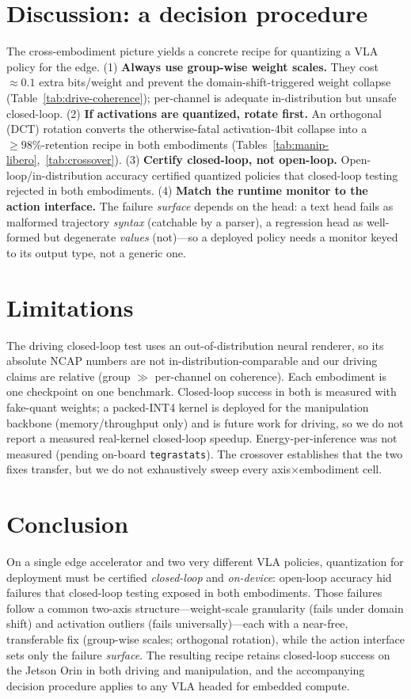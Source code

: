 \documentclass[conference]{IEEEtran}
\begin{document}
\section{Discussion: a decision procedure}
The cross-embodiment picture yields a concrete recipe for quantizing a VLA policy for the edge.
(1) \textbf{Always use group-wise weight scales.} They cost $\approx0.1$ extra bits/weight and
prevent the domain-shift-triggered weight collapse (Table~\ref{tab:drive-coherence}); per-channel is
adequate in-distribution but unsafe closed-loop. (2) \textbf{If activations are quantized, rotate
first.} An orthogonal (DCT) rotation converts the otherwise-fatal activation-4bit collapse into a
$\ge98\%$-retention recipe in both embodiments (Tables~\ref{tab:manip-libero},~\ref{tab:crossover}).
(3) \textbf{Certify closed-loop, not open-loop.} Open-loop/in-distribution accuracy certified
quantized policies that closed-loop testing rejected in both embodiments. (4) \textbf{Match the
runtime monitor to the action interface.} The failure \emph{surface} depends on the head: a text head
fails as malformed trajectory \emph{syntax} (catchable by a parser), a regression head as
well-formed but degenerate \emph{values} (not)---so a deployed policy needs a monitor keyed to its
output type, not a generic one.

\section{Limitations}
The driving closed-loop test uses an out-of-distribution neural renderer, so its absolute NCAP numbers
are not in-distribution-comparable and our driving claims are relative (group $\gg$ per-channel on
coherence). Each embodiment is one checkpoint on one benchmark. Closed-loop success in both is measured
with fake-quant weights; a packed-INT4 kernel is deployed for the manipulation backbone
(memory/throughput only) and is future work for driving, so we do not report a measured real-kernel
closed-loop speedup. Energy-per-inference was not measured (pending on-board \texttt{tegrastats}). The
crossover establishes that the two fixes transfer, but we do not exhaustively sweep every
axis$\times$embodiment cell.

\section{Conclusion}
On a single edge accelerator and two very different VLA policies, quantization for deployment must be
certified \emph{closed-loop} and \emph{on-device}: open-loop accuracy hid failures that closed-loop
testing exposed in both embodiments. Those failures follow a common two-axis structure---weight-scale
granularity (fails under domain shift) and activation outliers (fails universally)---each with a
near-free, transferable fix (group-wise scales; orthogonal rotation), while the action interface sets
only the failure \emph{surface}. The resulting recipe retains closed-loop success on the Jetson Orin
in both driving and manipulation, and the accompanying decision procedure applies to any VLA headed
for embedded compute.
\end{document}
